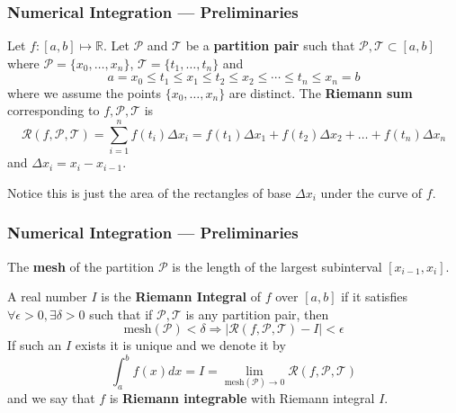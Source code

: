 \documentclass[11pt,xcolor={svgnames},aspectratio=169,usepdftitle=false]{beamer}
\begin{document}
\begin{frame}
  \frametitle{Numerical Integration --- Preliminaries}
\begin{definition}
  Let $f : [a,b]\mapsto\mathbb{R}$. Let $\mathcal{P}$ and $\mathcal{T}$ be a \alert{\textbf{partition pair}} such that $\mathcal{P},\mathcal{T}\subset [a,b]$ where $\mathcal{P} = \{x_0,\ldots,x_n\}$, $\mathcal{T} = \{t_1,\ldots,t_n\}$ and 
  \[
  a = x_0 \leq t_1 \leq x_1 \leq t_2 \leq x_2 \leq \cdots \leq t_n \leq x_n = b  
  \]
  where we assume the points $\{x_0,\ldots,x_n\}$ are distinct. The \alert{\textbf{Riemann sum}} corresponding to $f,\mathcal{P},\mathcal{T}$ is
  \[
  \mathcal{R}(f,\mathcal{P},\mathcal{T}) = \sum^n_{i=1}f(t_i)\Delta x_i = f(t_1)\Delta x_1 + f(t_2)\Delta x_2 + \ldots + f(t_n)\Delta x_n
  \]
  and $\Delta x_i = x_i - x_{i-1}$.
\end{definition}

{\footnotesize Notice this is just the area of the rectangles of base $\Delta x_i$ under the curve of $f$.}
\end{frame}

\begin{frame}
  \frametitle{Numerical Integration --- Preliminaries}
\begin{definition}
The \alert{\textbf{mesh}} of the partition $\mathcal{P}$ is the length of the largest subinterval $[x_{i-1},x_i]$.
\end{definition}
\begin{definition}
A real number $I$ is the \alert{\textbf{Riemann Integral}} of $f$ over $[a,b]$ if it satisfies $\forall \epsilon > 0, \exists \delta > 0$ such that if $\mathcal{P},\mathcal{T}$ is any partition pair, then
\[
\text{mesh}(\mathcal{P}) < \delta \Rightarrow \lvert \mathcal{R}(f,\mathcal{P},\mathcal{T}) - I \rvert < \epsilon
\]
If such an $I$ exists it is unique and we denote it by
\[
\int^b_a f(x)  dx = I = \lim_{\text{mesh}(\mathcal{P})\rightarrow 0} \mathcal{R}(f,\mathcal{P},\mathcal{T})
\]
and we say that $f$ is \alert{\textbf{Riemann integrable}} with Riemann integral $I$.
\end{definition}
\end{frame}
\end{document}
